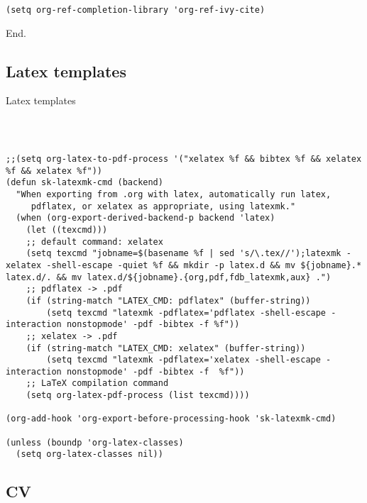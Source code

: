 \documentclass[12pt]{article}
\begin{document}
\begin{verbatim}
(setq org-ref-completion-library 'org-ref-ivy-cite)

\end{verbatim}
End.

\subsection{Latex templates}
\label{sec:org6f6bf4b}
Latex templates
\begin{verbatim}



;;(setq org-latex-to-pdf-process '("xelatex %f && bibtex %f && xelatex %f && xelatex %f"))
(defun sk-latexmk-cmd (backend)
  "When exporting from .org with latex, automatically run latex,
     pdflatex, or xelatex as appropriate, using latexmk."
  (when (org-export-derived-backend-p backend 'latex)
    (let ((texcmd)))
    ;; default command: xelatex
    (setq texcmd "jobname=$(basename %f | sed 's/\.tex//');latexmk -xelatex -shell-escape -quiet %f && mkdir -p latex.d && mv ${jobname}.* latex.d/. && mv latex.d/${jobname}.{org,pdf,fdb_latexmk,aux} .")
    ;; pdflatex -> .pdf
    (if (string-match "LATEX_CMD: pdflatex" (buffer-string))
        (setq texcmd "latexmk -pdflatex='pdflatex -shell-escape -interaction nonstopmode' -pdf -bibtex -f %f"))
    ;; xelatex -> .pdf
    (if (string-match "LATEX_CMD: xelatex" (buffer-string))
        (setq texcmd "latexmk -pdflatex='xelatex -shell-escape -interaction nonstopmode' -pdf -bibtex -f  %f"))
    ;; LaTeX compilation command
    (setq org-latex-pdf-process (list texcmd))))

(org-add-hook 'org-export-before-processing-hook 'sk-latexmk-cmd)

(unless (boundp 'org-latex-classes)
  (setq org-latex-classes nil))
\end{verbatim}

\subsection{CV}
\label{sec:org403552c}
\end{document}
